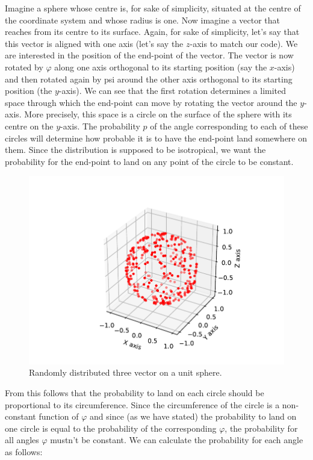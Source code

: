 \documentclass[12pt,a4paper,oneside,english]{article}
\begin{document}
Imagine a sphere whose centre is, for sake of simplicity, situated at the centre of the coordinate system and whose radius is one. Now imagine a vector that reaches from its centre to its surface. Again, for sake of simplicity, let’s say that this vector is aligned with one axis (let’s say the $z$-axis to match our code). We are interested in the position of the end-point of the vector. The vector is now rotated by $\varphi$ along one axis orthogonal to its starting position (say the $x$-axis) and then rotated again by psi around the other axis orthogonal to its starting position (the $y$-axis). We can see that the first rotation determines a limited space through which the end-point can move by rotating the vector around the $y$-axis. More precisely, this space is a circle on the surface of the sphere with its centre on the $y$-axis. The probability $p$ of the angle corresponding to each of these circles will determine how probable it is to have the end-point land somewhere on them. Since the distribution is supposed to be isotropical, we want the probability for the end-point to land on any point of the circle to be constant.
\begin{figure}[H]
	\centering
	\includegraphics[width=0.8\linewidth]{images/three_vector.pdf}
	\caption{Randomly distributed three vector on a unit sphere.}
	\label{fig:threevec}
\end{figure}
From this follows that the probability to land on each circle should be proportional to its circumference. Since the circumference of the circle is a non-constant function of $\varphi$ and since (as we have stated) the probability to land on one circle is equal to the probability of the corresponding $\varphi$, the probability for all angles $\varphi$ mustn’t be constant. We can calculate the probability for each angle as follows:
\end{document}
